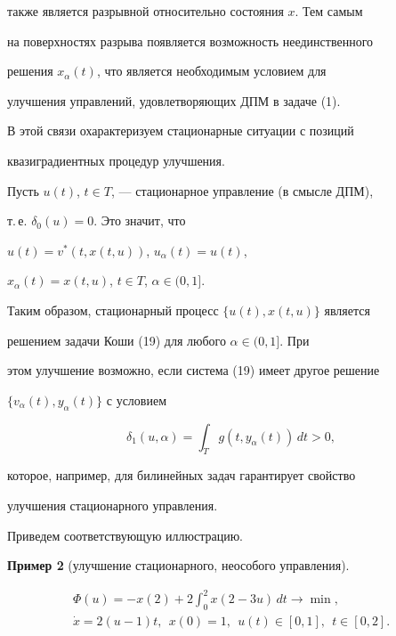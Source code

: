 также является разрывной относительно состояния $x$. Тем самым


на поверхностях разрыва появляется возможность неединственного


решения $x_{\alpha}(t)$, что является необходимым условием для


улучшения управлений, удовлетворяющих ДПМ в задаче (1).





В этой связи охарактеризуем стационарные ситуации с позиций


квазиградиентных процедур улучшения.





Пусть $u(t)$, $t \in T$, --- стационарное управление (в смысле ДПМ),


т.\,е. $\delta_{0}(u) = 0$. Это значит, что


$u(t) = v^{*}(t, x(t, u))$, $u_{\alpha}(t) = u(t)$,


$x_{\alpha}(t) = x(t, u)$, $t \in T$, $\alpha \in (0, 1]$.


Таким образом, стационарный процесс $\{ u(t), x(t, u)\}$ является


решением задачи Коши (19) для любого $\alpha \in (0, 1]$. При


этом улучшение возможно, если система (19) имеет другое решение


$\{v_{\alpha}(t), y_{\alpha}(t)\}$ с условием


$$


\delta_{1}(u, \alpha) = \int_{T} g(t, y_{\alpha}(t))\,dt > 0,


$$


которое, например, для билинейных задач гарантирует свойство


улучшения стационарного управления.





Приведем соответствующую иллюстрацию.


\medskip





{\bf Пример 2} (улучшение стационарного, неособого управления).


\begin{gather*}


\Phi(u) = - x(2) + 2 \int_{0}^{2} x(2 - 3 u)\,dt \rightarrow \min, \\


\Dot{x} = 2(u - 1)t,\ \ x(0) = 1,\ \ u(t) \in [0, 1],\ \ t \in [0, 2].


\end{gather*}


